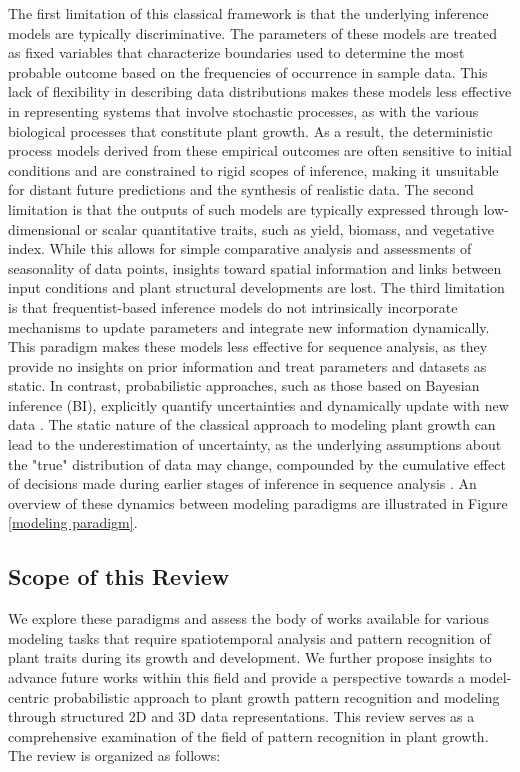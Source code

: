 \documentclass{article}
\begin{document}
The first limitation of this classical framework is that the underlying inference models are typically discriminative. The parameters of these models are treated as fixed variables that characterize boundaries used to determine the most probable outcome based on the frequencies of occurrence in sample data. This lack of flexibility in describing data distributions makes these models less effective in representing systems that involve stochastic processes, as with the various biological processes that constitute plant growth. As a result, the deterministic process models derived from these empirical outcomes are often sensitive to initial conditions and are constrained to rigid scopes of inference, making it unsuitable for distant future predictions and the synthesis of realistic data. The second limitation is that the outputs of such models are typically expressed through low-dimensional or scalar quantitative traits, such as yield, biomass, and vegetative index. While this allows for simple comparative analysis and assessments of seasonality of data points, insights toward spatial information and links between input conditions and plant structural developments are lost. The third limitation is that frequentist-based inference models do not intrinsically incorporate mechanisms to update parameters and integrate new information dynamically. This paradigm makes these models less effective for sequence analysis, as they provide no insights on prior information and treat parameters and datasets as static. In contrast, probabilistic approaches, such as those based on Bayesian inference (BI), explicitly quantify uncertainties and dynamically update with new data \cite{mackay2003information}. The static nature of the classical approach to modeling plant growth can lead to the underestimation of uncertainty, as the underlying assumptions about the "true" distribution of data may change, compounded by the cumulative effect of decisions made during earlier stages of inference in sequence analysis \cite{mcelreath2018statistical}. An overview of these dynamics between modeling paradigms are illustrated in Figure \ref{modeling paradigm}.


\subsection{Scope of this Review}
We explore these paradigms and assess the body of works available for various modeling tasks that require spatiotemporal analysis and pattern recognition of plant traits during its growth and development. 
We further propose insights to advance future works within this field and provide a perspective towards a model-centric probabilistic approach to plant growth pattern recognition and modeling through structured 2D and 3D data representations. 
This review serves as a comprehensive examination of the field of pattern recognition in plant growth.
The review is organized as follows:
\end{document}
